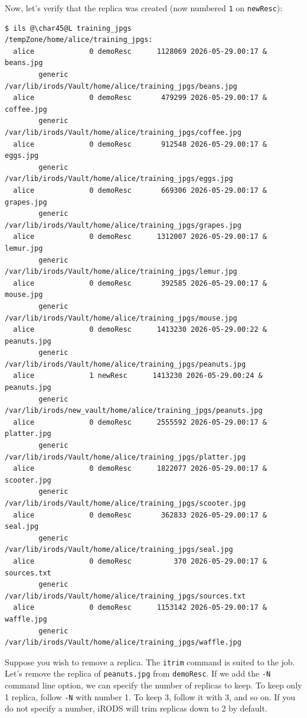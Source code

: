 \documentclass[10pt,oneside]{memoir}
\begin{document}
Now, let's verify that the replica was created (now numbered \texttt{1} on \texttt{newResc}):

\begin{lstlisting}[basicstyle=\tiny\ttfamily]
$ ils @\char45@L training_jpgs
/tempZone/home/alice/training_jpgs:
  alice             0 demoResc      1128069 2026-05-29.00:17 & beans.jpg
        generic    /var/lib/irods/Vault/home/alice/training_jpgs/beans.jpg
  alice             0 demoResc       479299 2026-05-29.00:17 & coffee.jpg
        generic    /var/lib/irods/Vault/home/alice/training_jpgs/coffee.jpg
  alice             0 demoResc       912548 2026-05-29.00:17 & eggs.jpg
        generic    /var/lib/irods/Vault/home/alice/training_jpgs/eggs.jpg
  alice             0 demoResc       669306 2026-05-29.00:17 & grapes.jpg
        generic    /var/lib/irods/Vault/home/alice/training_jpgs/grapes.jpg
  alice             0 demoResc      1312007 2026-05-29.00:17 & lemur.jpg
        generic    /var/lib/irods/Vault/home/alice/training_jpgs/lemur.jpg
  alice             0 demoResc       392585 2026-05-29.00:17 & mouse.jpg
        generic    /var/lib/irods/Vault/home/alice/training_jpgs/mouse.jpg
  alice             0 demoResc      1413230 2026-05-29.00:22 & peanuts.jpg
        generic    /var/lib/irods/Vault/home/alice/training_jpgs/peanuts.jpg
  alice             1 newResc      1413230 2026-05-29.00:24 & peanuts.jpg
        generic    /var/lib/irods/new_vault/home/alice/training_jpgs/peanuts.jpg
  alice             0 demoResc      2555592 2026-05-29.00:17 & platter.jpg
        generic    /var/lib/irods/Vault/home/alice/training_jpgs/platter.jpg
  alice             0 demoResc      1822077 2026-05-29.00:17 & scooter.jpg
        generic    /var/lib/irods/Vault/home/alice/training_jpgs/scooter.jpg
  alice             0 demoResc       362833 2026-05-29.00:17 & seal.jpg
        generic    /var/lib/irods/Vault/home/alice/training_jpgs/seal.jpg
  alice             0 demoResc          370 2026-05-29.00:17 & sources.txt
        generic    /var/lib/irods/Vault/home/alice/training_jpgs/sources.txt
  alice             0 demoResc      1153142 2026-05-29.00:17 & waffle.jpg
        generic    /var/lib/irods/Vault/home/alice/training_jpgs/waffle.jpg
\end{lstlisting}

Suppose you wish to remove a replica. The \texttt{itrim} command is suited to the job. Let's remove the replica of \texttt{peanuts.jpg} from \texttt{demoResc}. If we add the \texttt{-N} command line option, we can specify the number of replicas to keep. To keep only 1 replica, follow \texttt{-N} with number 1. To keep 3, follow it with 3, and so on. If you do not specify a number, iRODS will trim replicas down to 2 by default.
\end{document}
